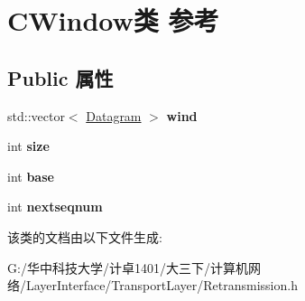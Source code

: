 \hypertarget{class_c_window}{}\section{C\+Window类 参考}
\label{class_c_window}
\subsection*{Public 属性}
\begin{DoxyCompactItemize}
\item 
\mbox{\label{class_c_window_adcdfe4662a9ee3e2dca546b3fcb1246b}} 
std\+::vector$<$ \hyperlink{class_datagram}{Datagram} $>$ {\bfseries wind}
\item 
\mbox{\label{class_c_window_a2784e1ec4cb2d6ae7fb90689784eefca}} 
int {\bfseries size}
\item 
\mbox{\label{class_c_window_a3c8f70c5a65a626d9640050bbc260841}} 
int {\bfseries base}
\item 
\mbox{\label{class_c_window_a11213b0138731799abc3855709124482}} 
int {\bfseries nextseqnum}
\end{DoxyCompactItemize}


该类的文档由以下文件生成\+:\begin{DoxyCompactItemize}
\item 
G\+:/华中科技大学/计卓1401/大三下/计算机网络/\+Layer\+Interface/\+Transport\+Layer/Retransmission.\+h\end{DoxyCompactItemize}
